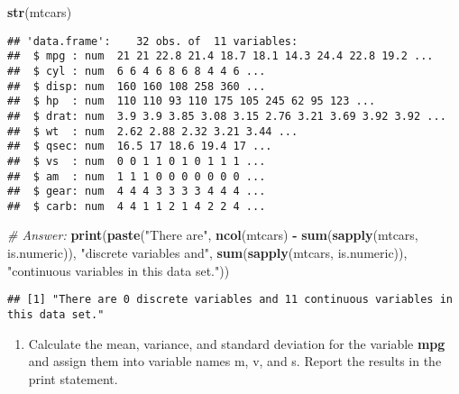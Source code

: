 \documentclass[
]{article}
\newenvironment{Shaded}{\begin{snugshade}}{\end{snugshade}}
\newcommand{\CommentTok}[1]{\textcolor[rgb]{0.56,0.35,0.01}{\textit{#1}}}
\newcommand{\FunctionTok}[1]{\textcolor[rgb]{0.13,0.29,0.53}{\textbf{#1}}}
\newcommand{\NormalTok}[1]{#1}
\newcommand{\SpecialCharTok}[1]{\textcolor[rgb]{0.81,0.36,0.00}{\textbf{#1}}}
\newcommand{\StringTok}[1]{\textcolor[rgb]{0.31,0.60,0.02}{#1}}
\providecommand{\tightlist}{%
  \setlength{\itemsep}{0pt}\setlength{\parskip}{0pt}}
\begin{document}
\begin{Shaded}
\begin{Highlighting}[]
\FunctionTok{str}\NormalTok{(mtcars)}
\end{Highlighting}
\end{Shaded}

\begin{verbatim}
## 'data.frame':    32 obs. of  11 variables:
##  $ mpg : num  21 21 22.8 21.4 18.7 18.1 14.3 24.4 22.8 19.2 ...
##  $ cyl : num  6 6 4 6 8 6 8 4 4 6 ...
##  $ disp: num  160 160 108 258 360 ...
##  $ hp  : num  110 110 93 110 175 105 245 62 95 123 ...
##  $ drat: num  3.9 3.9 3.85 3.08 3.15 2.76 3.21 3.69 3.92 3.92 ...
##  $ wt  : num  2.62 2.88 2.32 3.21 3.44 ...
##  $ qsec: num  16.5 17 18.6 19.4 17 ...
##  $ vs  : num  0 0 1 1 0 1 0 1 1 1 ...
##  $ am  : num  1 1 1 0 0 0 0 0 0 0 ...
##  $ gear: num  4 4 4 3 3 3 3 4 4 4 ...
##  $ carb: num  4 4 1 1 2 1 4 2 2 4 ...
\end{verbatim}

\begin{Shaded}
\begin{Highlighting}[]
\CommentTok{\# Answer:}
\FunctionTok{print}\NormalTok{(}\FunctionTok{paste}\NormalTok{(}\StringTok{"There are"}\NormalTok{, }\FunctionTok{ncol}\NormalTok{(mtcars) }\SpecialCharTok{{-}} \FunctionTok{sum}\NormalTok{(}\FunctionTok{sapply}\NormalTok{(mtcars, is.numeric)), }\StringTok{"discrete variables and"}\NormalTok{, }\FunctionTok{sum}\NormalTok{(}\FunctionTok{sapply}\NormalTok{(mtcars, is.numeric)), }\StringTok{"continuous variables in this data set."}\NormalTok{))}
\end{Highlighting}
\end{Shaded}

\begin{verbatim}
## [1] "There are 0 discrete variables and 11 continuous variables in this data set."
\end{verbatim}

\begin{enumerate}
\def\labelenumi{\alph{enumi}.}
\setcounter{enumi}{2}
\tightlist
\item
  Calculate the mean, variance, and standard deviation for the variable
  \textbf{mpg} and assign them into variable names m, v, and s. Report
  the results in the print statement.
\end{enumerate}
\end{document}
